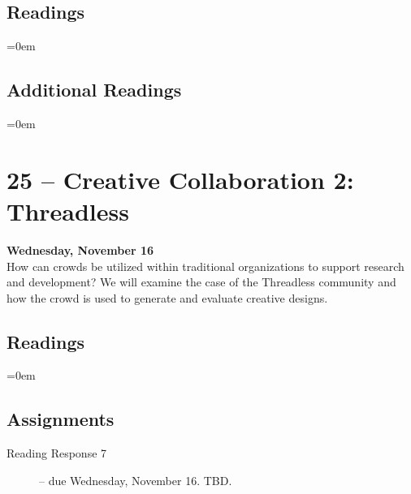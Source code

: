 \documentclass[10pt]{memoir}
\newenvironment{readinglist}{
\begin{list}{}{\leftmargin=8pt \itemindent=0em}
  \setlength{\itemsep}{8pt}
  \setlength{\parskip}{0em}
  \setlength{\parsep}{1em}
  \setlength{\parindent}{8em}}
{\end{list}}
\begin{document}
    \subsection{Readings}
    \begin{readinglist}
        \item {}
        \item {}
    \end{readinglist}
    
    \subsection{Additional Readings}
    \begin{readinglist}
        \item {}
        \item {}
        \item {}
        \item {}
    \end{readinglist}

\section{25 -- Creative Collaboration 2: Threadless}
\textcolor{CUGold}{\textbf{Wednesday, November 16}}\\
How can crowds be utilized within traditional organizations to support research and development? We will examine the case of the Threadless community and how the crowd is used to generate and evaluate creative designs.

    \subsection{Readings}
    \begin{readinglist}
        \item {}
        \item {}
    \end{readinglist}
        
    \subsection{Assignments}
    \begin{description}%
        \item[Reading Response 7 ] -- due Wednesday, November 16. TBD.
    \end{description}
    
\end{document}
